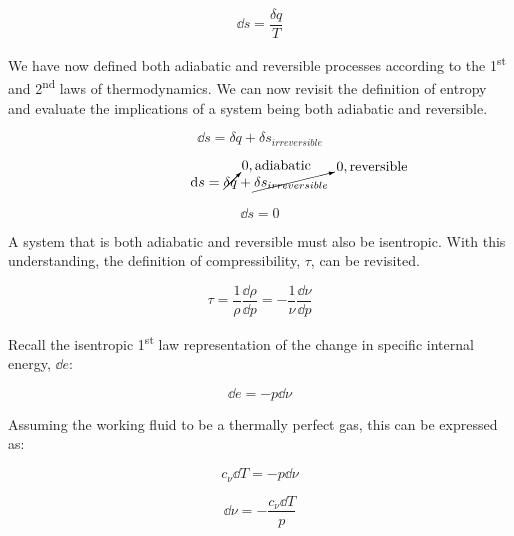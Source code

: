 \documentclass[12pt,letterpaper]{article}
\begin{document}
\begin{enumerate}[label=(\alph*)]
\begin{enumerate}[label=\arabic*.]
					\begin{equation*}
						\dd s = \frac{\delta q}{T}
					\end{equation*}
					
					We have now defined both adiabatic and reversible processes according to the 1\textsuperscript{st} and 2\textsuperscript{nd} laws of thermodynamics. We can now revisit the definition of entropy and evaluate the implications of a system being both adiabatic and reversible.
					
					\begin{equation*}
						\dd s = \delta q + \delta s_{irreversible}
					\end{equation*}
				
					\begin{equation*}
						\dd s = \cancelto{0, \mathrm{adiabatic}}{\delta q} + \cancelto{0, \mathrm{reversible}}{\delta s_{irreversible}}				
					\end{equation*}
					
					\begin{equation*}
						\boxed{\dd s = 0}
					\end{equation*}
				
					A system that is both adiabatic and reversible must also be isentropic. With this understanding, the definition of compressibility, $\tau$, can be revisited.
				
					\begin{equation*}
						\tau = \frac{1}{\rho}\frac{\dd \rho}{\dd p} = - \frac{1}{\nu}\frac{\dd\nu}{\dd p}
					\end{equation*}
				
					Recall the isentropic 1\textsuperscript{st} law representation of the change in specific internal energy, $\dd e$:
					
					\begin{equation*}
						\dd e = - p \dd \nu
					\end{equation*}
				
					Assuming the working fluid to be a thermally perfect gas, this can be expressed as:
					
					\begin{equation*}
						c_\nu \dd T= -p \dd \nu
					\end{equation*}
					
					\begin{equation*}
						\boxed{\dd \nu = - \frac{c_{\nu}\dd T}{p}}
					\end{equation*}				
				

\end{enumerate}
\end{enumerate}
\end{document}
